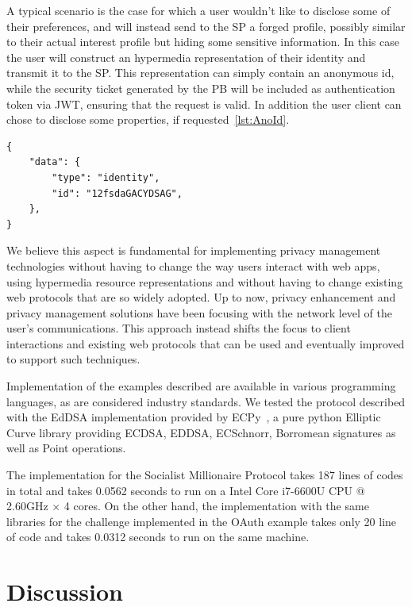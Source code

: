 A typical scenario is the case for which a user wouldn't like to disclose some of their preferences, and will instead send to the SP a forged profile, possibly similar to their actual interest profile but hiding some sensitive information. In this case the user will construct an hypermedia representation of their identity and transmit it to the SP. This representation can simply contain an anonymous id, while the security ticket generated by the PB will be included as authentication token via JWT, ensuring that the request is valid. In addition the user client can chose to disclose some properties, if requested~\ref{lst:AnoId}.

\begin{lstlisting}
{
    "data": {
        "type": "identity",
        "id": "12fsdaGACYDSAG",
    },
}
\end{lstlisting}

We believe this aspect is fundamental for implementing privacy management technologies without having to change the way users interact with web apps, using hypermedia resource representations and without having to change existing web protocols that are so widely adopted. Up to now, privacy enhancement and privacy management solutions have been focusing with the network level of the user's communications. This approach instead shifts the focus to client interactions and existing web protocols that can be used and eventually improved to support such techniques.

Implementation of the examples described are available in various programming languages, as are considered industry standards. We tested the protocol described with the EdDSA implementation provided by ECPy~\cite{ecpy}, a pure python Elliptic Curve library providing ECDSA, EDDSA, ECSchnorr, Borromean signatures as well as Point operations.

The implementation for the Socialist Millionaire Protocol takes 187 lines of codes in total and takes 0.0562 seconds to run on a Intel Core i7-6600U CPU @ 2.60GHz × 4 cores. On the other hand, the implementation with the same libraries for the challenge implemented in the OAuth example takes only 20 line of code and takes 0.0312 seconds to run on the same machine.

\section{Discussion}

